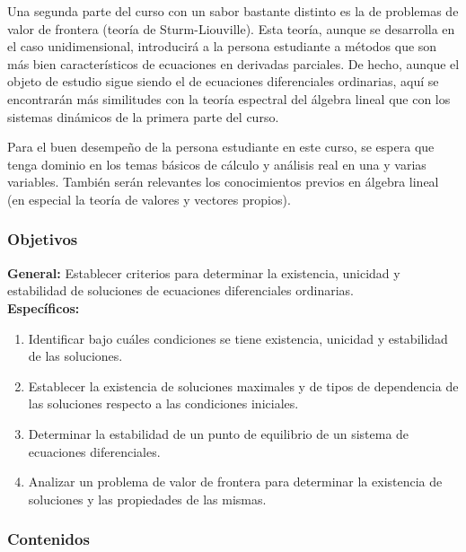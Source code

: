 \begin{refsection}
Una segunda parte del curso con un sabor bastante distinto es la de problemas de valor de frontera (teoría de Sturm-Liouville). Esta teoría, aunque se desarrolla en el caso unidimensional, introducirá a la persona estudiante a métodos que son más bien característicos de ecuaciones en derivadas parciales. De hecho, aunque el objeto de estudio sigue siendo el de ecuaciones diferenciales ordinarias, aquí se encontrarán más similitudes con la teoría espectral del álgebra lineal que con los sistemas dinámicos de la primera parte del curso.

Para el buen desempeño de la persona estudiante en este curso, se espera que tenga dominio en los temas básicos de cálculo y análisis real en una y varias variables. También serán relevantes los conocimientos previos en álgebra lineal (en especial la teoría de valores y vectores propios).



\subsubsection*{Objetivos}

\textbf{General:} Establecer criterios para determinar la existencia, unicidad y estabilidad de soluciones de ecuaciones diferenciales ordinarias.\\

\textbf{Específicos:}

\begin{enumerate}
\item Identificar bajo cuáles condiciones se tiene existencia, unicidad y estabilidad de las soluciones.
\item Establecer la existencia de soluciones maximales y de tipos de dependencia de las soluciones respecto a las condiciones iniciales.
\item Determinar la estabilidad de un punto de equilibrio de un sistema de ecuaciones diferenciales.
\item Analizar un problema de valor de frontera para determinar la existencia de soluciones y las propiedades de las mismas.
\end{enumerate} 

\subsubsection*{Contenidos}




\end{refsection}
